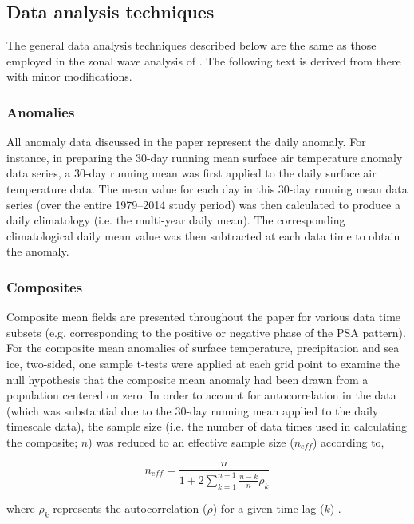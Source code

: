 \subsection{Data analysis techniques}

The general data analysis techniques described below are the same as those employed in the zonal wave analysis of \citet{IrvingSimmonds2015}. The following text is derived from there with minor modifications.

\subsubsection{Anomalies}
All anomaly data discussed in the paper represent the daily anomaly. For instance, in preparing the 30-day running mean surface air temperature anomaly data series, a 30-day running mean was first applied to the daily surface air temperature data. The mean value for each day in this 30-day running mean data series (over the entire 1979--2014 study period) was then calculated to produce a daily climatology (i.e. the multi-year daily mean). The corresponding climatological daily mean value was then subtracted at each data time to obtain the anomaly.  

\subsubsection{Composites}
Composite mean fields are presented throughout the paper for various data time subsets (e.g. corresponding to the positive or negative phase of the PSA pattern). For the composite mean anomalies of surface temperature, precipitation and sea ice, two-sided, one sample t-tests were applied at each grid point to examine the null hypothesis that the composite mean anomaly had been drawn from a population centered on zero. In order to account for autocorrelation in the data (which was substantial due to the 30-day running mean applied to the daily timescale data), the sample size (i.e. the number of data times used in calculating the composite; $n$) was reduced to an effective sample size ($n_{eff}$) according to,

\begin{equation}\label{eq:effective_sample_size}
n_{eff} = \frac{n}{1 + 2\displaystyle\sum_{k=1}^{n-1} \frac{n-k}{n}\rho_k}
\end{equation}

\noindent where $\rho_k$ represents the autocorrelation ($\rho$) for a given time lag ($k$) \citep{Zieba2010}.  


